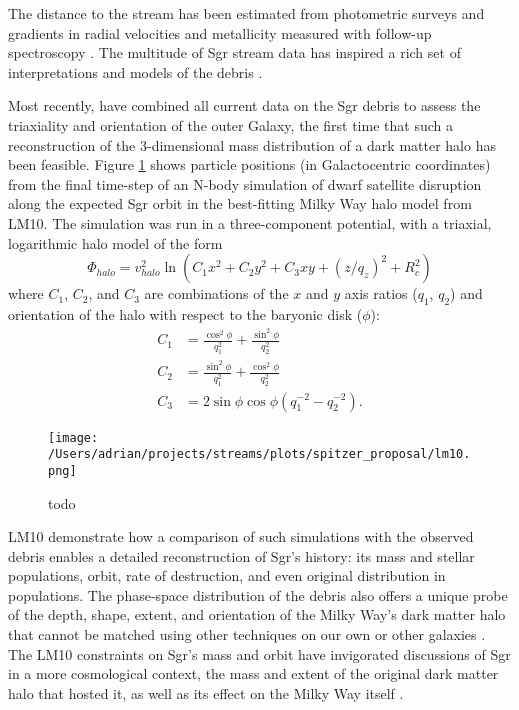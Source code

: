 \documentclass[preprint]{aastex}
\begin{document}
The distance to the stream has been estimated from photometric surveys
\citep[e.g.,][]{martinezdelgado04} and gradients in radial
velocities and metallicity measured with follow-up spectroscopy
\citep[e.g.,][]{majewski04, vivas05, bellazzini06, chou07,
  chou10, keller10, carlin12}. The multitude of Sgr stream data
has inspired a rich set of interpretations and models of the debris
\citep[e.g.,][]{johnston99b, helmi04, law05, fellhauer06,
  law10}.

Most recently, \citet[][hereafter LM10]{law10} have combined all
current data on the Sgr debris to assess the triaxiality and
orientation of the outer Galaxy, the first time that such a
reconstruction of the 3-dimensional mass distribution of a dark matter
halo has been feasible. Figure \ref{fig:lm10} shows particle positions
(in Galactocentric coordinates) from the final time-step of an N-body
simulation of dwarf satellite disruption along the expected Sgr orbit
in the best-fitting Milky Way halo model from LM10. The simulation was
run in a three-component potential, with a triaxial, logarithmic halo
model of the form
\begin{equation}
  \Phi_{halo} = v_{halo}^2 \ln(C_1 x^2 + C_2 y^2 + C_3 xy + (z/q_z)^2 + R_c^2)
\end{equation}
where $C_1$, $C_2$, and $C_3$ are combinations of the $x$ and $y$ axis
ratios ($q_1$, $q_2$) and orientation of the halo with respect to the
baryonic disk ($\phi$):
\begin{align}
  C_1 &= \frac{\cos^2\phi}{q_1^2} + \frac{\sin^2\phi}{q_2^2}\\
  C_2 &= \frac{\sin^2\phi}{q_1^2} + \frac{\cos^2\phi}{q_2^2}\\
  C_3 &= 2\sin\phi\cos\phi \left(q_1^{-2} - q_2^{-2}\right).
\end{align}

\begin{figure}[h]
\begin{center}
\texttt{[image: /Users/adrian/projects/streams/plots/spitzer\_proposal/lm10.png]}
\caption{ todo }\label{fig:lm10}
\end{center}
\end{figure}

LM10 demonstrate how a comparison of such simulations with the
observed debris enables a detailed reconstruction of Sgr's history:
its mass and stellar populations, orbit, rate of destruction, and even
original distribution in populations. The phase-space distribution of
the debris also offers a unique probe of the depth, shape, extent, and
orientation of the Milky Way's dark matter halo that cannot be matched
using other techniques on our own or other galaxies
\citep[e.g.,][]{ibata01}. The LM10 constraints on Sgr's mass and orbit
have invigorated discussions of Sgr in a more cosmological context,
the mass and extent of the original dark matter halo that hosted it,
as well as its effect on the Milky Way itself
\citep{bailin03,purcell11,micheldansac11,gomez12}.
\end{document}

